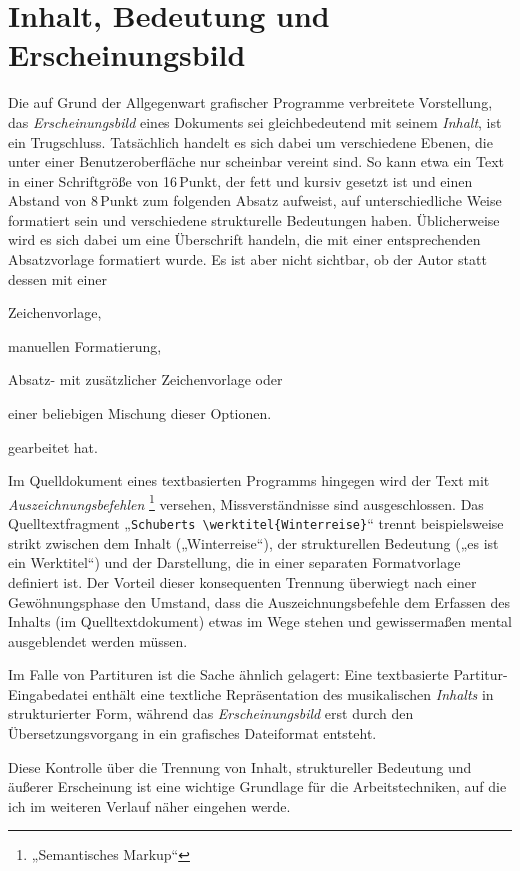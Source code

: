 \documentclass[DIV=12]{scrreprt}
\begin{document}
\section{Inhalt, Bedeutung und Erscheinungsbild}
\label{sec:pt_separation-content-meaning-appearance}
Die auf Grund der Allgegenwart grafischer Programme verbreitete Vorstellung, das \emph{Erscheinungsbild} eines Dokuments sei gleichbedeutend mit seinem \emph{Inhalt}, ist ein Trugschluss.
Tatsächlich handelt es sich dabei um verschiedene Ebenen, die unter einer Benutzeroberfläche nur scheinbar vereint sind.
So kann etwa ein Text in einer Schriftgröße von 16\,Punkt, der fett und kursiv gesetzt ist und einen Abstand von 8\,Punkt zum folgenden Absatz aufweist, auf unterschiedliche Weise formatiert sein und verschiedene strukturelle Bedeutungen haben.
Üblicherweise wird es sich dabei um eine Überschrift handeln, die mit einer entsprechenden Absatzvorlage formatiert wurde.
Es ist aber nicht sichtbar, ob der Autor statt dessen mit einer
\begin{inparaenum}[1)]
\item Zeichenvorlage,
\item manuellen Formatierung,
\item Absatz- mit zusätzlicher Zeichenvorlage oder
\item einer beliebigen Mischung dieser Optionen.
\end{inparaenum}
gearbeitet hat.

Im Quelldokument eines textbasierten Programms hingegen wird der Text mit \emph{Auszeichnungsbefehlen}%
\footnote{„Semantisches Markup“}
versehen, Missverständnisse sind ausgeschlossen.
Das Quelltextfragment „\texttt{Schuberts \textbackslash werktitel\{Winterreise\}}“ trennt beispielsweise strikt zwischen dem Inhalt („Winterreise“), der strukturellen Bedeutung („es ist ein Werktitel“) und der Darstellung, die in einer separaten Formatvorlage definiert ist.
Der Vorteil dieser konsequenten Trennung überwiegt nach einer Gewöhnungsphase den Umstand, dass die Auszeichnungsbefehle dem Erfassen des Inhalts (im Quelltextdokument) etwas im Wege stehen und gewissermaßen mental ausgeblendet werden müssen.

Im Falle von Partituren ist die Sache ähnlich gelagert:
Eine textbasierte Partitur-Eingabedatei enthält eine textliche Repräsentation des musikalischen \emph{Inhalts} in strukturierter Form, während das \emph{Erscheinungsbild} erst durch den Übersetzungsvorgang in ein grafisches Dateiformat entsteht.

Diese Kontrolle über die Trennung von Inhalt, struktureller Bedeutung und äußerer Erscheinung ist eine wichtige Grundlage für die Arbeitstechniken, auf die ich im weiteren Verlauf näher eingehen werde.
\end{document}
